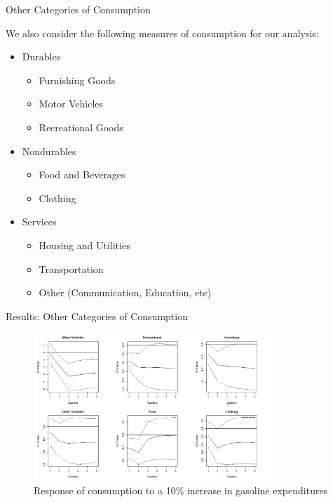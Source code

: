 \documentclass[
  10pt,
  ignorenonframetext,
]{beamer}
\providecommand{\tightlist}{%
  \setlength{\itemsep}{0pt}\setlength{\parskip}{0pt}}
\begin{document}
\begin{frame}{Other Categories of Consumption}
\protect\hypertarget{other-categories-of-consumption}{}

We also consider the following measures of consumption for our analysis:

\begin{itemize}
\tightlist
\item
  Durables

  \begin{itemize}
  \tightlist
  \item
    Furnishing Goods\\
  \item
    Motor Vehicles
  \item
    Recreational Goods
  \end{itemize}
\item
  Nondurables

  \begin{itemize}
  \tightlist
  \item
    Food and Beverages
  \item
    Clothing
  \end{itemize}
\item
  Services

  \begin{itemize}
  \tightlist
  \item
    Housing and Utilities
  \item
    Transportation
  \item
    Other (Communication, Education, etc)
  \end{itemize}
\end{itemize}

\end{frame}

\begin{frame}{Results: Other Categories of Consumption}
\protect\hypertarget{results-other-categories-of-consumption}{}

\begin{figure}
\centering
\includegraphics[width=0.8\textwidth,height=\textheight]{Disaggregated - 1.jpeg}
\caption{Response of consumption to a 10\% increase in gasoline
expenditures}
\end{figure}

\end{frame}
\end{document}
